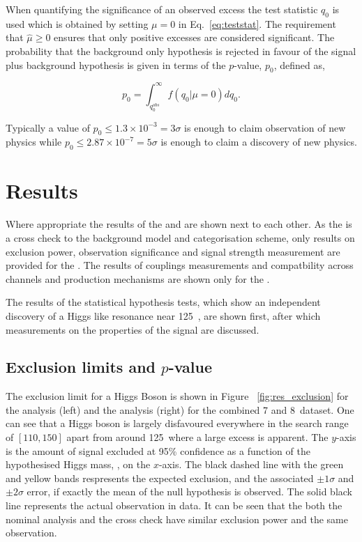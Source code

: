 When quantifying the significance of an observed excess the test statistic $q_{0}$ is used which is obtained by setting $\mu=0$ in Eq.~\ref{eq:teststat}. The requirement that $\hat{\mu}\geq0$ ensures that only positive excesses are considered significant. The probability that the background only hypothesis is rejected in favour of the signal plus background hypothesis is given in terms of the $p$-value, $p_{0}$, defined as,

\begin{equation}
  p_{0} = \int_{q_{0}^{obs}}^{\infty}f(q_{0}|\mu=0)dq_{0}.
  \label{eq:pvalue}
\end{equation}

Typically a value of $p_{0}\leq1.3\times10^{-3}=3\sigma$ is enough to claim observation of new physics while $p_{0}\leq2.87\times10^{-7}=5\sigma$ is enough to claim a discovery of new physics.


\section{Results}

Where appropriate the results of the \MFM and \SMVA are shown next to each other. As the \SMVA is a cross check to the background model and categorisation scheme, only results on exclusion power, observation significance and signal strength measurement are provided for the \SMVA. The results of couplings measurements and compatbility across channels and production mechanisms are shown only for the \MFM.

The results of the statistical hypothesis tests, which show an independent discovery of a Higgs like resonance near 125~\GeV, are shown first, after which measurements on the properties of the signal are discussed.

\subsection{Exclusion limits and $p$-value}

The exclusion limit for a \SM Higgs Boson is shown in Figure ~\ref{fig:res_exclusion} for the \MFM analysis (left) and the \SMVA analysis (right) for the combined 7 and 8~\TeV dataset. One can see that a \SM Higgs boson is largely disfavoured everywhere in the search range of $[110,150]$ apart from around 125~\GeV where a large excess is apparent. The $y$-axis is the amount of \SM signal excluded at 95\% confidence as a function of the hypothesised Higgs mass, \mH, on the $x$-axis. The black dashed line with the green and yellow bands respresents the expected exclusion, and the associated $\pm1\sigma$ and $\pm2\sigma$ error, if exactly the mean of the null hypothesis is observed. The solid black line represents the actual observation in data. It can be seen that the both the nominal \MFM analysis and the cross check \SMVA have similar exclusion power and the same observation.

